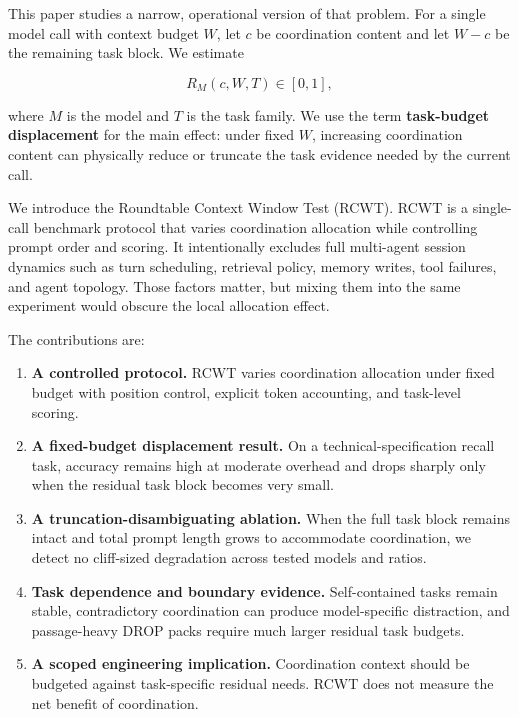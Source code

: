 \documentclass[
  runningheads]{llncs}
\providecommand{\tightlist}{%
  \setlength{\itemsep}{0pt}\setlength{\parskip}{0pt}}
\begin{document}
This paper studies a narrow, operational version of that problem. For a
single model call with context budget \(W\), let \(c\) be coordination
content and let \(W-c\) be the remaining task block. We estimate

\[
R_M(c,W,T) \in [0,1],
\]

where \(M\) is the model and \(T\) is the task family. We use the term
\textbf{task-budget displacement} for the main effect: under fixed
\(W\), increasing coordination content can physically reduce or truncate
the task evidence needed by the current call.

We introduce the Roundtable Context Window Test (RCWT). RCWT is a
single-call benchmark protocol that varies coordination allocation while
controlling prompt order and scoring. It intentionally excludes full
multi-agent session dynamics such as turn scheduling, retrieval policy,
memory writes, tool failures, and agent topology. Those factors matter,
but mixing them into the same experiment would obscure the local
allocation effect.

The contributions are:

\begin{enumerate}
\def\labelenumi{\arabic{enumi}.}
\tightlist
\item
  \textbf{A controlled protocol.} RCWT varies coordination allocation
  under fixed budget with position control, explicit token accounting,
  and task-level scoring.
\item
  \textbf{A fixed-budget displacement result.} On a
  technical-specification recall task, accuracy remains high at moderate
  overhead and drops sharply only when the residual task block becomes
  very small.
\item
  \textbf{A truncation-disambiguating ablation.} When the full task
  block remains intact and total prompt length grows to accommodate
  coordination, we detect no cliff-sized degradation across tested
  models and ratios.
\item
  \textbf{Task dependence and boundary evidence.} Self-contained tasks
  remain stable, contradictory coordination can produce model-specific
  distraction, and passage-heavy DROP packs require much larger residual
  task budgets.
\item
  \textbf{A scoped engineering implication.} Coordination context should
  be budgeted against task-specific residual needs. RCWT does not
  measure the net benefit of coordination.
\end{enumerate}
\end{document}
